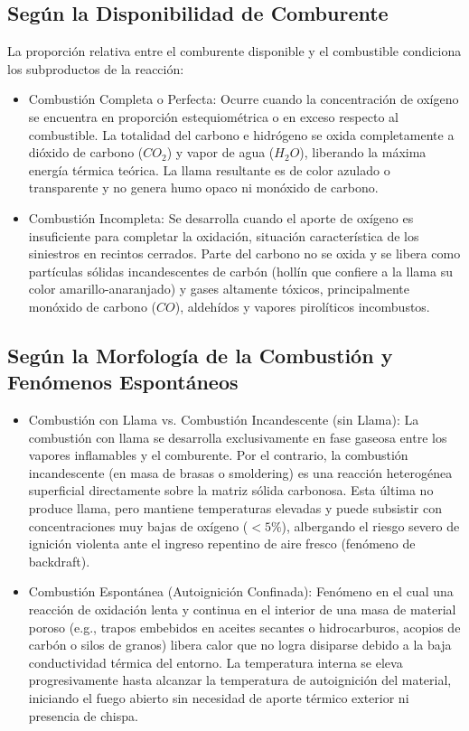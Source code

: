 \subsection{Según la Disponibilidad de Comburente}

La proporción relativa entre el comburente disponible y el combustible condiciona los subproductos de la reacción:

\begin{itemize}
    \item Combustión Completa o Perfecta: Ocurre cuando la concentración de oxígeno se encuentra en proporción
          estequiométrica o en exceso respecto al combustible. La totalidad del carbono e hidrógeno se oxida completamente
          a dióxido de carbono ($CO_2$) y vapor de agua ($H_2 O$), liberando la máxima energía térmica teórica. La llama
          resultante es de color azulado o transparente y no genera humo opaco ni monóxido de carbono.
    \item Combustión Incompleta: Se desarrolla cuando el aporte de oxígeno es insuficiente para completar la oxidación,
          situación característica de los siniestros en recintos cerrados. Parte del carbono no se oxida y se libera como
          partículas sólidas incandescentes de carbón (hollín que confiere a la llama su color amarillo-anaranjado) y gases
          altamente tóxicos, principalmente monóxido de carbono ($CO$), aldehídos y vapores pirolíticos incombustos.
\end{itemize}

\subsection{Según la Morfología de la Combustión y Fenómenos Espontáneos}

\begin{itemize}
    \item Combustión con Llama vs. Combustión Incandescente (sin Llama): La combustión con llama se desarrolla
          exclusivamente en fase gaseosa entre los vapores inflamables y el comburente. Por el contrario, la combustión
          incandescente (en masa de brasas o smoldering) es una reacción heterogénea superficial directamente sobre la matriz
          sólida carbonosa. Esta última no produce llama, pero mantiene temperaturas elevadas y puede subsistir con
          concentraciones muy bajas de oxígeno ($< 5\percent$), albergando el riesgo severo de ignición violenta ante el
          ingreso repentino de aire fresco (fenómeno de backdraft).
    \item Combustión Espontánea (Autoignición Confinada): Fenómeno en el cual una reacción de oxidación lenta y continua en
          el interior de una masa de material poroso (e.g., trapos embebidos en aceites secantes o hidrocarburos, acopios de
          carbón o silos de granos) libera calor que no logra disiparse debido a la baja conductividad térmica del entorno.
          La temperatura interna se eleva progresivamente hasta alcanzar la temperatura de autoignición del material,
          iniciando el fuego abierto sin necesidad de aporte térmico exterior ni presencia de chispa.
\end{itemize}


